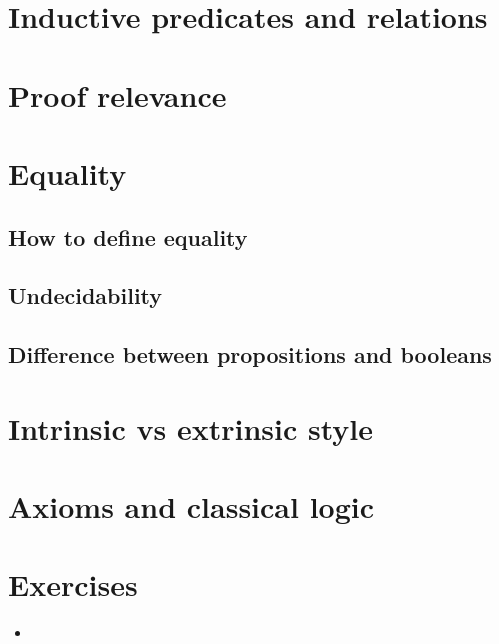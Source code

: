 \documentclass{beamer}
\begin{document}
\section{Inductive predicates and relations}

\section{Proof relevance}

\section{Equality}
\subsection{How to define equality}
\subsection{Undecidability}
\subsection{Difference between propositions and booleans}

\section{Intrinsic vs extrinsic style}

\section{Axioms and classical logic}

\section{Exercises}

\begin{frame}{}
\begin{itemize}
	\item 
\end{itemize}
\end{frame}
\end{document}
